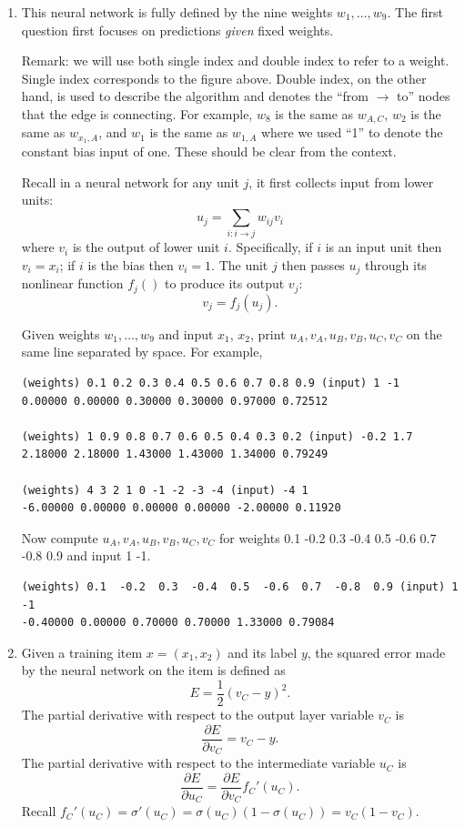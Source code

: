 \documentclass[a4paper]{article}
\theoremstyle{definition}
\newenvironment{soln}{
    \leavevmode\color{blue}\ignorespaces
}{}
\begin{document}
\begin{enumerate}
\item
This neural network is fully defined by the nine weights $w_1, \ldots, w_9$.
The first question first focuses on predictions \emph{given} fixed weights.

Remark: we will use both single index and double index to refer to a weight.
Single index corresponds to the figure above.
Double index, on the other hand, is used to describe the algorithm and denotes the ``from $\rightarrow$ to'' nodes that the edge is connecting.
For example, $w_8$ is the same as $w_{A,C}$, $w_2$ is the same as $w_{x_1, A}$, and $w_1$ is the same as $w_{1,A}$ where we used ``1'' to denote the constant bias input of one.
These should be clear from the context.

Recall in a neural network for any unit $j$, it first collects input from lower units:
$$u_j = \sum_{i: i\rightarrow j} w_{ij} v_i$$
where $v_i$ is the output of lower unit $i$. Specifically, if $i$ is an input unit then $v_i=x_i$; if $i$ is the bias then $v_i=1$.
The unit $j$ then passes $u_j$ through its nonlinear function $f_j()$ to produce its output $v_j$:
$$v_j = f_j(u_j).$$

Given weights $w_1, \ldots, w_9$ and input $x_1$, $x_2$,
print $u_A, v_A, u_B, v_B, u_C, v_C$ on the same line separated by space. 
For example,
\begin{verbatim}
(weights) 0.1 0.2 0.3 0.4 0.5 0.6 0.7 0.8 0.9 (input) 1 -1
0.00000 0.00000 0.30000 0.30000 0.97000 0.72512 

(weights) 1 0.9 0.8 0.7 0.6 0.5 0.4 0.3 0.2 (input) -0.2 1.7
2.18000 2.18000 1.43000 1.43000 1.34000 0.79249 

(weights) 4 3 2 1 0 -1 -2 -3 -4 (input) -4 1
-6.00000 0.00000 0.00000 0.00000 -2.00000 0.11920 
\end{verbatim}

Now compute $u_A, v_A, u_B, v_B, u_C, v_C$ for weights 0.1 -0.2 0.3 -0.4 0.5 -0.6 0.7 -0.8 0.9 and input 1 -1.

\begin{soln}

\begin{verbatim}
(weights) 0.1  -0.2  0.3  -0.4  0.5  -0.6  0.7  -0.8  0.9 (input) 1 -1
-0.40000 0.00000 0.70000 0.70000 1.33000 0.79084
\end{verbatim}

\end{soln}


\item
Given a training item $x=(x_1, x_2)$ and its label $y$, the squared error made by the neural network on the item is defined as
$$E = \frac{1}{2}(v_C - y)^2.$$
The partial derivative with respect to the output layer variable $v_C$ is 
$$\frac{\partial E}{\partial v_C} = v_C - y.$$
The partial derivative with respect to the intermediate variable $u_C$ is 
$$\frac{\partial E}{\partial u_C} = \frac{\partial E}{\partial v_C} f_C'(u_C).$$
Recall $f_C'(u_C) = \sigma'(u_C) = \sigma(u_C)(1-\sigma(u_C)) = v_C (1-v_C)$.


\end{enumerate}
\end{document}
